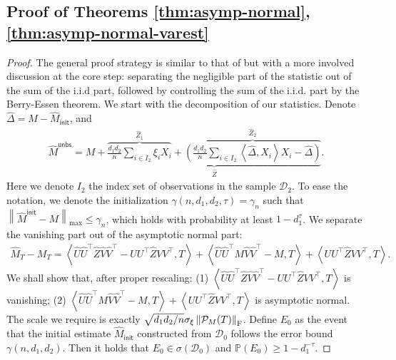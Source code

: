 \documentclass[12pt]{article}
\newcommand{\tF}{{\rm F}}
\newcommand{\norm}[1]{\left\lVert#1\right\rVert}
\newcommand{\PP}{\mathbb{P}}
\newcommand{\cP}{\mathcal{P}}
\newcommand{\cD}{\mathcal{D}}
\def\calD{{\mathcal D}}
\def\PP{{\mathbb P}}
\theoremstyle{plain}
\begin{document}
\subsection{Proof of Theorems \ref{thm:asymp-normal}, \ref{thm:asymp-normal-varest}}
\begin{proof}
    The general proof strategy is similar to that of \cite{xia2021statistical} but with a more involved discussion at the core step: separating the negligible part of the statistic out of the sum of the i.i.d part, followed by controlling the sum of the i.i.d. part by the Berry-Essen theorem. We start with the decomposition of our statistics. Denote $\widehat{\Delta}=M-\widehat{M}_{\mathsf{init} }$, and 
    \begin{equation*}
        \begin{aligned}
          \widehat{M}^{\mathsf {unbs }} = M+ \underbrace{ \overbrace{\frac{d_1 d_2}{n} \sum_{i\in I_2 } \xi_i X_i}^{\widehat{Z}_1} +\overbrace{\left(\frac{d_1 d_2}{n} \sum_{i\in I_2 }\left\langle\widehat{\Delta}, X_i\right\rangle X_i-\widehat{\Delta}\right)}^{\widehat{Z}_2 } }_{\widehat Z }.
    \end{aligned}
    \end{equation*}
Here we denote $I_2$ the index set of observations in the sample $\calD_2$. 
    To ease the notation, we denote the initialization $\gamma(n,d_1,d_2,\tau)= \gamma_{n}$ such that $\norm{\widehat{M}^{\mathsf{init} }-M }_{\max}\le \gamma_{n}$, which holds with probability at least $1-d_1^\tau$. 
We separate the vanishing part out of the asymptotic normal part:
    \begin{equation*}
        \begin{aligned}
          \widehat{M}_{T}-M_T = \left\langle \widehat{U}\widehat{U}^\top \widehat{Z} \widehat{V}\widehat{V}^\top - UU^\top \widehat{Z}VV^\top, T \right\rangle + \left\langle \widehat{U}\widehat{U}^\top M \widehat{V}\widehat{V}^\top - M, T \right\rangle + \left\langle UU^\top \widehat{Z}VV^\top, T\right\rangle.
    \end{aligned}
    \end{equation*}
We shall show that, after proper rescaling: (1) $\left\langle \widehat{U}\widehat{U}^\top \widehat{Z} \widehat{V}\widehat{V}^\top - UU^\top \widehat{Z}VV^\top, T \right\rangle$ is vanishing; (2) $\left\langle \widehat{U}\widehat{U}^\top M \widehat{V}\widehat{V}^\top - M, T \right\rangle + \left\langle UU^\top \widehat{Z}VV^\top, T\right\rangle$ is asymptotic normal. The scale we require is exactly $\sqrt{d_1 d_2/n}\sigma_{\xi}\norm{\cP_M(T) }_{\tF}$. Define $E_0$ as the event that the initial estimate $\widehat{M}_{\mathsf{init}}$ constructed from $\cD_0$ follows the error bound $\gamma(n,d_1,d_2)$. Then it holds that $E_0\in \sigma (\cD_0)$ and $\PP (E_0)\ge 1- d_1^{-\tau}$.


\end{proof}
\end{document}
